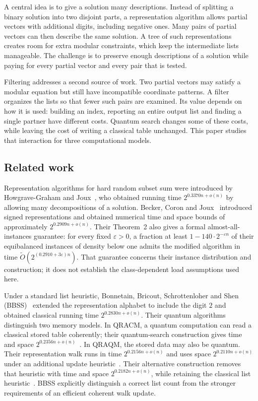 \documentclass[10pt,a4paper]{article}
\theoremstyle{definition}
\begin{document}
A central idea is to give a solution many descriptions. Instead of
splitting a binary solution into two disjoint parts, a representation
algorithm allows partial vectors with additional digits, including
negative ones. Many pairs of partial vectors can then describe the same
solution. A tree of such representations creates room for extra modular
constraints, which keep the intermediate lists manageable. The challenge
is to preserve enough descriptions of a solution while paying for every
partial vector and every pair that is tested.

Filtering addresses a second source of work. Two partial vectors may
satisfy a modular equation but still have incompatible coordinate
patterns. A filter organizes the lists so that fewer such pairs are
examined. Its value depends on how it is used: building an index,
reporting an entire output list and finding a single partner have
different costs. Quantum search changes some of these costs, while
leaving the cost of writing a classical table unchanged. This paper
studies that interaction for three computational models.

\subsection{Related work}
Representation algorithms for hard random subset sum were introduced by
Howgrave-Graham and Joux~\cite{HGJ}, who obtained running time
$2^{0.3370n+o(n)}$
by allowing many decompositions of a solution. Becker, Coron and
Joux~\cite{BCJ} introduced signed representations and obtained numerical
time and space bounds of approximately $2^{0.2909n+o(n)}$. Their Theorem~2 also
gives a formal almost-all-instances guarantee: for every fixed
$\varepsilon>0$, a fraction at least $1-140\cdot2^{-\varepsilon n}$ of
their equibalanced instances of density below one admits the modified
algorithm in time $\widetilde O(2^{(0.2910+3\varepsilon)n})$.
That guarantee concerns their instance distribution and construction;
it does not establish the class-dependent load assumptions used here.

Under a standard list heuristic, Bonnetain, Bricout, Schrottenloher and
Shen (BBSS)~\cite{BBSS} extended
the representation alphabet to include the digit $2$ and obtained
classical running time $2^{0.2830n+o(n)}$. Their quantum algorithms distinguish two
memory models. In QRACM, a quantum computation can read a classical
stored table coherently; their quantum-search construction gives time
and space $2^{0.2356n+o(n)}$~\cite[Section~4.3 and Table~2]{BBSS}.
In QRAQM, the stored data may also be quantum. Their representation walk
runs in time $2^{0.2156n+o(n)}$ and uses space $2^{0.2110n+o(n)}$
under an additional
update heuristic~\cite[Section~5.3]{BBSS}. Their alternative construction
removes that heuristic with time and space $2^{0.2182n+o(n)}$, while
retaining the classical list heuristic~\cite[Section~6.4]{BBSS}.
BBSS explicitly distinguish a correct list count from the stronger
requirements of an efficient coherent walk update.
\end{document}
